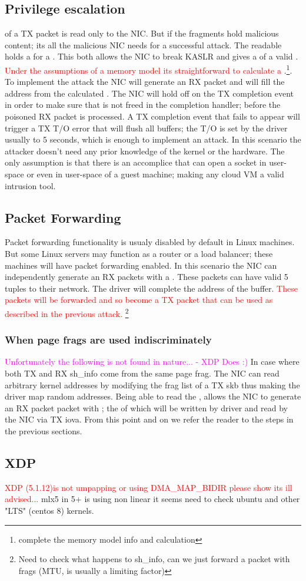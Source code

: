 \subsection{Privilege escalation}
\shinfo of a TX packet is read only to the NIC.
But if the fragments hold malicious content; its all the malicious NIC needs for a successful attack. The readable \shinfo holds a \kva for a \page. This both allows the NIC to break KASLR and gives a \kva of a valid \mabaf. \textcolor{red}{Under the assumptions of a memory model its straightforward to calculate a \kva}.\footnote{complete the memory model info and calculation}. To implement the attack the NIC will generate an RX packet and will fill the \uarg address from the calculated \kva.
The NIC will hold off on the TX completion event in order to make sure that \kva is not freed in the completion handler; before the poisoned RX packet is processed. A TX completion event that fails to appear will trigger a TX T/O error that will flush all buffers; the T/O is set by the driver usually to 5 seconds, which is enough to implement an attack.\newline
In this scenario the attacker doesn't need any prior knowledge of the kernel or the hardware. The only assumption is that there is an accomplice that can open a socket in user-space or even in user-space of a guest machine; making any cloud VM a valid intrusion tool.

\subsection{Packet Forwarding}
Packet forwarding functionality is usualy disabled by default in Linux machines. But some Linux servers may function as a router or a load balancer; these machines will have packet forwarding enabled. In this scenario the NIC can independently generate an RX packets with a \mabaf. These packets can have valid 5 tuples to their network. The driver will complete the \page address of the buffer. \textcolor{red}{These packets will be forwarded and so become a TX packet that can be used as described in the previous attack.} \footnote{Need to check what happens to sh\_info, can we just forward a packet with frags (MTU, is usually a limiting factor)}

\subsubsection{When page frags are used indiscriminately}
\textcolor{magenta}{Unfortunately the following is not found in nature... - XDP Does :)}\newline
In case where both TX and RX sh\_info come from the same page frag. The NIC can read arbitrary kernel addresses by modifying the frag list of a TX skb thus making the driver map random addresses.
Being able to read the \shinfo, allows the NIC to generate an RX packet packet with \mabaf; the \kva of which will be written by driver and read by the NIC via TX iova. From this point and on we refer the reader to the steps in the previous sections.
\subsection{XDP}
\textcolor{red}{XDP (5.1.12)is not umpapping or using DMA\_MAP\_BIDIR \- please show its ill advised...} mlx5 in 5+ is using non linear it seems need to check ubuntu and other "LTS" (centos 8) kernels.